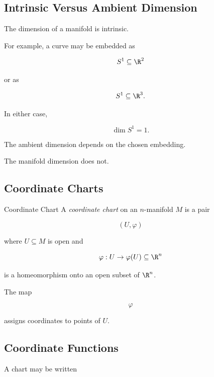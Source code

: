 \subsection{Intrinsic Versus Ambient Dimension}
\label{subsec:intrinsic-ambient-dimension}

The dimension of a manifold is intrinsic.

For example, a curve may be embedded as

\[
S^1\subseteq\R^2
\]

or as

\[
S^1\subseteq\R^3.
\]

In either case,

\[
\boxed{
\dim S^1=1.
}
\]

The ambient dimension depends on the chosen embedding.

The manifold dimension does not.

\subsection{Coordinate Charts}
\label{subsec:coordinate-charts-manifolds}

\begin{definitionbox}{Coordinate Chart}
A \emph{coordinate chart} on an \(n\)-manifold \(M\) is a pair

\[
\boxed{
(U,\varphi)
}
\]

where \(U\subseteq M\) is open and

\[
\varphi:U\to\varphi(U)\subseteq\R^n
\]

is a homeomorphism onto an open subset of \(\R^n\).
\end{definitionbox}

The map

\[
\varphi
\]

assigns coordinates to points of \(U\).

\subsection{Coordinate Functions}
\label{subsec:coordinate-functions}

A chart may be written

